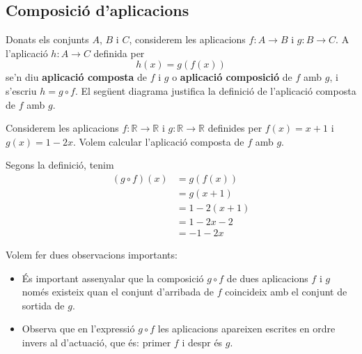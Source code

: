 \subsection{Composici\'{o} d'aplicacions}

Donats els conjunts $A$, $B$ i $C$, considerem les aplicacions $%
f:A\longrightarrow B$ i $g:B\longrightarrow C$. A l'aplicaci\'{o} $%
h:A\longrightarrow C$ definida per%
\begin{equation*}
h(x)=g\left( f(x)\right)
\end{equation*}
se'n diu \textbf{aplicaci\'{o} composta} de $f$ i $g$ o \textbf{aplicaci\'{o}
composici\'{o}} de $f$ amb $g$, i s'escriu $h=g\circ f$. El seg\"{u}ent
diagrama justifica la definici\'{o} de l'aplicaci\'{o} composta de $f$ amb $g
$.

\begin{exemple}
Considerem les aplicacions $f:\mathbb{R}\longrightarrow\mathbb{R}$ i $g:%
\mathbb{R}\longrightarrow\mathbb{R}$ definides per $f(x)=x+1$ i $g(x)=1-2x$.
Volem calcular l'aplicaci\'{o} composta de $f$ amb $g$.
\end{exemple}

\begin{solucio}
Segons la definici\'{o}, tenim%
\begin{align*}
(g\circ f)(x) & =g\left( f(x)\right) \\
& =g(x+1) \\
& =1-2(x+1) \\
& =1-2x-2 \\
& =-1-2x
\end{align*}
\end{solucio}

\begin{observacio}
Volem fer dues observacions importants:

\begin{itemize}
\item \'{E}s important assenyalar que la composici\'{o} $g\circ f$ de dues
aplicacions $f$ i $g$ nom\'{e}s existeix quan el conjunt d'arribada de $f$
coincideix amb el conjunt de sortida de $g$.

\item Observa que en l'expressi\'{o} $g\circ f$ les aplicacions apareixen
escrites en ordre invers al d'actuaci\'{o}, que \'{e}s: primer $f$ i despr%
\'{e}s $g$.
\end{itemize}
\end{observacio}

